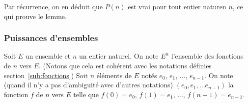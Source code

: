     Par récurrence, on en déduit que $P(n)$ est vrai pour tout entier naturen $n$, ce qui prouve le lemme.

   \done 

\subsubsection{Puissances d'ensembles}

Soit $E$ un ensemble et $n$ un entier naturel. 
On note $E^n$ l'ensemble des fonctions de $n$ vers $E$. 
(Notons que cela est cohérent avec les notations définies section~\ref{sub:fonctions})
Soit $n$ éléments de $E$ notés $e_0$, $e_1$, ..., $e_{n-1}$. 
On note (quand il n'y a pas d'ambiguité avec d'autres notations) $\left( e_0, e_1, \dots e_{n-1} \right)$ la fonction $f$ de $n$ vers $E$ telle que $f(0) = e_0$, $f(1) = e_1$, ..., $f(n-1) = e_{n-1}$. 
